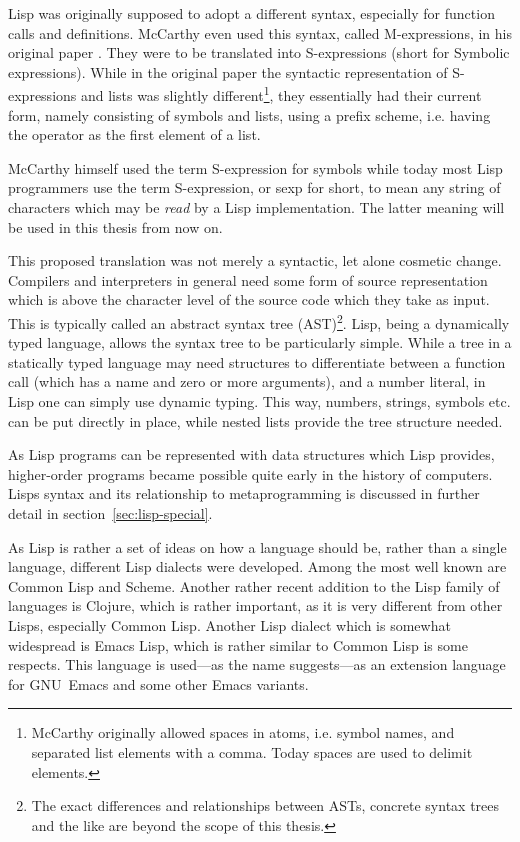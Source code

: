 \documentclass[a4paper,10pt,twoside]{report}
\newcommand{\el}{Emacs Lisp}
\newcommand{\cl}{Common Lisp}
\newcommand{\emacs}{GNU~Emacs}
\begin{document}
Lisp was originally supposed to adopt a different syntax, especially for
function calls and definitions.  McCarthy even used this syntax, called
M-expressions, in his original paper \cite{rec-fun-sym-expr}.  They were to be
translated into S-expressions (short for Symbolic expressions).  While in the
original paper the syntactic representation of S-expressions and lists was
slightly different\footnote{McCarthy originally allowed spaces in atoms,
  i.e. symbol names, and separated list elements with a comma.  Today spaces are
  used to delimit elements.}, they essentially had their current form, namely
consisting of symbols and lists, using a prefix scheme, i.e. having the operator
as the first element of a list.

McCarthy himself used the term S-expression for symbols while today most Lisp
programmers use the term S-expression, or sexp for short, to mean any string of
characters which may be \emph{read} by a Lisp implementation.  The latter
meaning will be used in this thesis from now on.

This proposed translation was not merely a syntactic, let alone cosmetic change.
Compilers and interpreters in general need some form of source representation
which is above the character level of the source code which they take as input.
This is typically called an abstract syntax tree (AST)\footnote{The exact
  differences and relationships between ASTs, concrete syntax trees and the like
  are beyond the scope of this thesis.}.  Lisp, being a dynamically typed
language, allows the syntax tree to be particularly simple.  While a tree in a
statically typed language may need structures to differentiate between a
function call (which has a name and zero or more arguments), and a number
literal, in Lisp one can simply use dynamic typing.  This way, numbers, strings,
symbols etc. can be put directly in place, while nested lists provide the tree
structure needed.

As Lisp programs can be represented with data structures which Lisp provides,
higher-order programs became possible quite early in the history of computers.
Lisps syntax and its relationship to metaprogramming is discussed in further
detail in section~\ref{sec:lisp-special}.

As Lisp is rather a set of ideas on how a language should be, rather than a
single language, different Lisp dialects were developed.  Among the most well
known are \cl{} and Scheme.  Another rather recent addition to the Lisp family
of languages is Clojure, which is rather important, as it is very different from
other Lisps, especially \cl{}.  Another Lisp dialect which is somewhat
widespread is \el{}, which is rather similar to \cl{} is some respects.  This
language is used---as the name suggests---as an extension language for \emacs{}
and some other Emacs variants.
\end{document}
